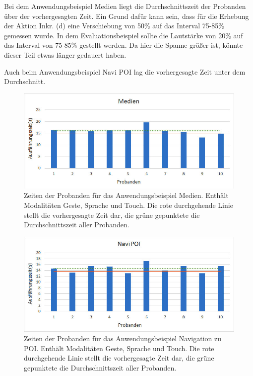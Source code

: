 Bei dem Anwendungsbeispiel Medien liegt die Durchschnittszeit der Probanden über der vorhergesagten Zeit. Ein Grund dafür kann sein, dass für die Erhebung der Aktion Inkr. (d) eine Verschiebung von 50\% auf das Interval 75-85\% gemessen wurde. In dem Evaluationsbeispiel sollte die Lautstärke von 20\% auf das Interval von 75-85\% gestellt werden. Da hier die Spanne größer ist, könnte dieser Teil etwas länger gedauert haben. 

Auch beim Anwendungsbeispiel Navi POI lag die vorhergesagte Zeit unter dem Durchschnitt. 
\begin{figure}[ht]
			\centering
			\includegraphics[width=1\textwidth]{img/Medien_Times.jpg}
			\caption[Zeiten der Probanden für das Anwendungsbeispiel Medien.]{Zeiten der Probanden für das Anwendungsbeispiel Medien. Enthält Modalitäten Geste, Sprache und Touch. Die rote durchgehende Linie stellt die vorhergesagte Zeit dar, die grüne gepunktete die Durchschnittszeit aller Probanden.}
			\label{fig:Medien_Times}
\end{figure}
\begin{figure}[ht]
			\centering
			\includegraphics[width=1\textwidth]{img/Navi_POI_Times.jpg}
			\caption[Zeiten der Probanden für das Anwendungsbeispiel Navigation zu POI.]{Zeiten der Probanden für das Anwendungsbeispiel Navigation zu POI. Enthält Modalitäten Geste, Sprache und Touch. Die rote durchgehende Linie stellt die vorhergesagte Zeit dar, die grüne gepunktete die Durchschnittszeit aller Probanden.}
			\label{fig:Navi_POI_Times}		
\end{figure}

